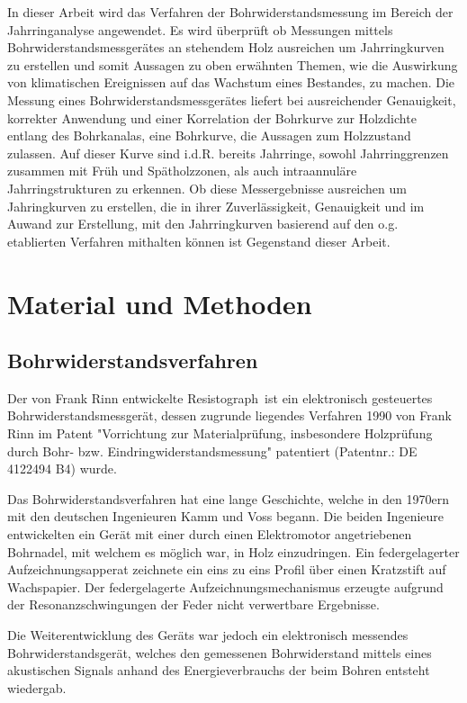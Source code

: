 \documentclass[a4paper, halfparskip]{article}
\def\SymbReg{\textsuperscript{\textregistered}}
\begin{document}
In dieser Arbeit wird das Verfahren der Bohrwiderstandsmessung im Bereich der
Jahrringanalyse angewendet. Es wird überprüft ob Messungen mittels
Bohrwiderstandsmessgerätes an stehendem Holz ausreichen um Jahrringkurven zu
erstellen und somit Aussagen zu oben erwähnten Themen, wie die Auswirkung von
klimatischen Ereignissen auf das Wachstum eines Bestandes, zu machen. Die
Messung eines Bohrwiderstandsmessgerätes liefert bei ausreichender
Genauigkeit, korrekter Anwendung und einer Korrelation der Bohrkurve zur
Holzdichte entlang des Bohrkanalas, eine Bohrkurve, die Aussagen
zum Holzzustand zulassen. Auf dieser Kurve sind i.d.R. bereits
Jahrringe, sowohl Jahrringgrenzen zusammen mit Früh und Spätholzzonen, als
auch intraannuläre Jahrringstrukturen zu erkennen. Ob diese Messergebnisse
ausreichen um Jahringkurven zu erstellen, die in ihrer Zuverlässigkeit,
Genauigkeit und im Auwand zur Erstellung, mit den Jahrringkurven basierend auf
den o.g. etablierten Verfahren mithalten können ist Gegenstand dieser Arbeit.



\section{Material und Methoden}\label{sec:material}
\subsection{Bohrwiderstandsverfahren}\label{subsec:bohrwiderstandsverfahren}
Der von Frank Rinn entwickelte Resistograph\SymbReg\ ist ein elektronisch
gesteuertes Bohrwiderstandsmessgerät, dessen zugrunde liegendes Verfahren 1990
von Frank Rinn im Patent "Vorrichtung zur Materialprüfung, insbesondere
Holzprüfung durch Bohr- bzw. Eindringwiderstandsmessung"{} patentiert
(Patentnr.: DE 4122494 B4) wurde.

Das Bohrwiderstandsverfahren hat eine lange Geschichte, welche in den 1970ern
mit den deutschen Ingenieuren Kamm und Voss begann. Die beiden Ingenieure
entwickelten ein Gerät mit einer durch einen Elektromotor angetriebenen
Bohrnadel, mit welchem es möglich war, in Holz einzudringen. Ein
federgelagerter Aufzeichnungsapperat zeichnete ein eins zu eins Profil über
einen Kratzstift auf Wachspapier. Der federgelagerte Aufzeichnungsmechanismus
erzeugte aufgrund der Resonanzschwingungen der Feder nicht verwertbare
Ergebnisse. 

Die Weiterentwicklung des Geräts war jedoch ein elektronisch messendes
Bohrwiderstandsgerät, welches den gemessenen Bohrwiderstand mittels eines
akustischen Signals anhand des Energieverbrauchs der beim Bohren entsteht
wiedergab.
\end{document}

